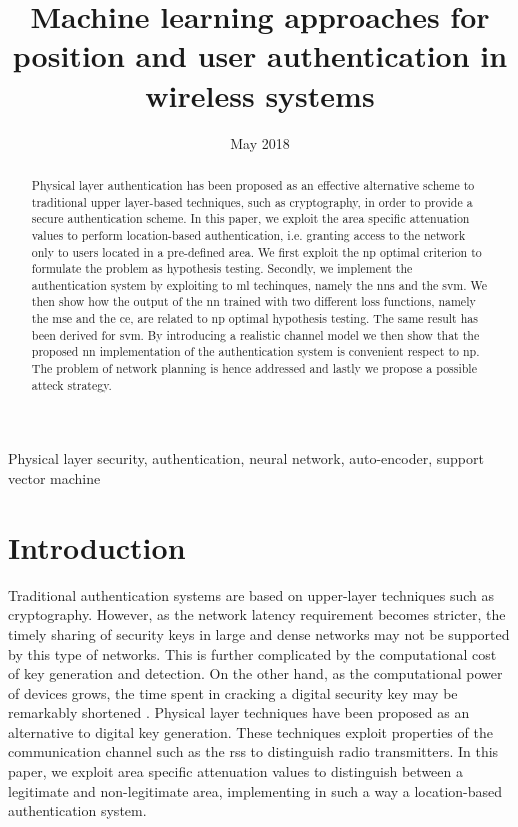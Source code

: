 \documentclass[draftcls,onecolumn,12pt]{IEEEtran}
\title{Machine learning approaches for position and user authentication in wireless systems}
\author{ }
\date{May 2018}
\begin{document}
\maketitle

\sloppy

\begin{abstract}
Physical layer authentication has been proposed as an effective alternative scheme to traditional upper layer-based techniques, such as cryptography, in order to provide a secure authentication scheme. In this paper, we exploit the area specific attenuation values to perform location-based authentication, i.e. granting access to the network only to users located in a pre-defined area. We first exploit the \ac{np} optimal criterion to formulate the problem as hypothesis testing. Secondly, we implement the authentication system by exploiting to \ac{ml} techinques, namely the \acp{nn} and the \ac{svm}. We then show how the output of the \ac{nn} trained with two different loss functions, namely the \ac{mse} and the \ac{ce}, are related to \ac{np} optimal hypothesis testing. The same result has been derived for \ac{svm}. By introducing a realistic channel model we then show that the proposed \ac{nn} implementation of the authentication system is convenient respect to \ac{np}. The problem of network planning is hence addressed and lastly we propose a possible atteck strategy.
\end{abstract}

\begin{IEEEkeywords}
Physical layer security, authentication, neural network, auto-encoder, support vector machine
\end{IEEEkeywords}

\glsresetall

\section{Introduction}
Traditional authentication systems are based on upper-layer techniques such as cryptography. However, as the network latency requirement becomes stricter, the timely sharing of security keys in large and dense networks may not be supported by this type of networks. This is further complicated by the computational cost of key generation and detection. On the other hand, as the computational power of devices grows, the time spent in cracking a digital security key may be remarkably shortened \cite{Wang-16}. Physical layer techniques have been proposed as an alternative to digital key generation. These techniques exploit properties of the communication channel such as the \ac{rss} to distinguish radio transmitters. In this paper, we exploit area specific attenuation values to distinguish between a legitimate and non-legitimate area, implementing in such a way a location-based authentication system.
\end{document}
